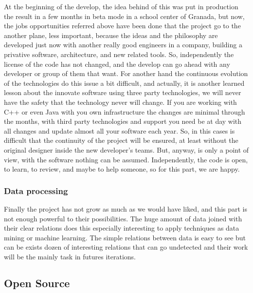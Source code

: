 At the beginning of the develop, the idea behind of this was put in production
the result in a few months in beta mode in a school center of Granada, but now,
the jobs opportunities referred above have been done that the project go to the
another plane, less important, because the ideas and the philosophy are
developed just now with another really good engineers in a company, building a
privative software, architecture, and new related tools.
\intro
So, independently the license of the code has not changed, and the develop can
go ahead with any developer or group of them that want. For another hand the
continuous evolution of the technologies do this issue a
bit difficult, and actually, it is another learned lesson about the innovate
software using three party technologies, we will never have the safety that the
technology never will change. If you are working with C++ or even Java with you
own infrastructure the changes are minimal through the months, with third party
technologies and support you need be at day with all changes and update almost
all your software each year. So, in this cases is difficult that the continuity
of the project will be ensured, at least without the original designer inside the
new developer's teams. But, anyway, is only a point of view, with the software
nothing can be assumed.
\intro
Independently, the code is open, to learn, to review, and maybe to help someone,
so for this part, we are happy.

\subsubsection{Data processing}

Finally the project has not grow as much as we would have liked, and this part
is not enough powerful to their possibilities. The huge amount of data joined
with their clear relations does this especially interesting to apply techniques
as data mining or machine learning. The simple relations between data is easy
to see but can be exists dozen of interesting relations that can go undetected
and their work will be the mainly task in futures iterations.

\subsection{Open Source}

